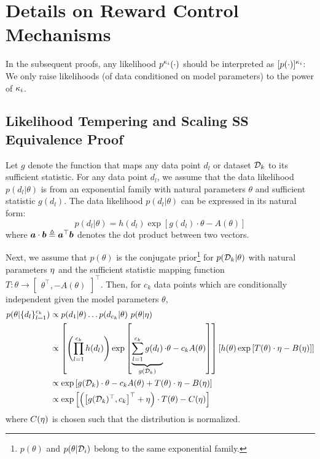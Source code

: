 \documentclass{article}
\theoremstyle{plain}
\theoremstyle{definition}
\theoremstyle{remark}
\begin{document}
\section{Details on Reward Control Mechanisms}\label{app:reward}






In the subsequent proofs, any likelihood $p^{\kappa_i}(\cdot)$ should be interpreted as $[p(\cdot)]^{\kappa_i}$: We only raise likelihoods (of data conditioned on model parameters) to the power of ${\kappa_i}$.

\subsection{Likelihood Tempering and Scaling SS Equivalence Proof}

Let $g$ denote the function that maps any data point $d_l$ or dataset ${\mathcal{D}}_k$ to its sufficient statistic.
For any data point $d_l$, we assume that the data likelihood $p(d_l|\theta)$ is from an exponential family with natural parameters $\theta$ and sufficient statistic $g(d_l)$.
The data likelihood $p(d_l|\theta)$ can be expressed in its natural form:
\[
p(d_l|\theta) = h(d_l)\exp{\left[g(d_l) \cdot \theta - A(\theta)\right]}
\]
where ${\bm{a}} \cdot {\bm{b}} \triangleq {\bm{a}}^\top {\bm{b}}$ denotes the dot product between two vectors.

Next, we assume that $p(\theta)$ is the conjugate prior\footnote{$p(\theta)$ and $p(\theta|{\mathcal{D}}_i)$ belong to the same exponential family.} for $p({\mathcal{D}}_k|\theta)$ with natural parameters $\mathbf{\eta}$ and the sufficient statistic mapping function $T: \theta \rightarrow \begin{bmatrix} \theta^\top, -A(\theta) \end{bmatrix}^\top$. 
Then, for $c_k$ data points which are conditionally independent given the model parameters $\theta$,
\begin{align*}
    p(\theta|\{d_l\}_{l=1}^{c_k}) & \propto p(d_1|\theta) \dots p(d_{c_k}|\theta)\ p(\theta|\mathbf{\eta}) \\
    & \propto \left[ \left(\prod_{l=1}^{c_k} h(d_l) \right) \exp\left[\underbrace{\sum_{l=1}^{c_k} g(d_l)}_{g({\mathcal{D}}_k)} \cdot \theta - c_k A(\theta)\right] \right]
    \left[ h(\theta)\exp{[T(\theta) \cdot \mathbf{\eta}- B(\mathbf{\eta})]} \right] \\
    & \propto \exp\left[g({\mathcal{D}}_k) \cdot \theta - c_k A(\theta) + T(\theta) \cdot \mathbf{\eta} - B(\mathbf{\eta}) \right] \\
    & \propto \exp\left[
    \left(\begin{bmatrix}g({\mathcal{D}}_k)^\top, c_k \end{bmatrix}^\top + \mathbf{\eta} \right) \cdot T(\theta) - C(\mathbf{\eta}) \right]
\end{align*}
where $C(\mathbf{\eta})$ is chosen such that the distribution is normalized.
\end{document}
